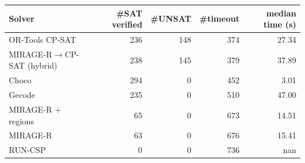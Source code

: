 \begin{table}[t]
{\begin{tabular}{lrrrr}
\toprule
Solver & \#SAT verified & \#UNSAT & \#timeout & median time (s) \\
\midrule
OR-Tools CP-SAT & 236 & 148 & 374 & 27.34 \\
MIRAGE-R$\to$CP-SAT (hybrid) & 238 & 145 & 379 & 37.89 \\
Choco & 294 & 0 & 452 & 3.01 \\
Gecode & 235 & 0 & 510 & 47.00 \\
MIRAGE-R + regions & 65 & 0 & 673 & 14.51 \\
MIRAGE-R & 63 & 0 & 676 & 15.41 \\
RUN-CSP & 0 & 0 & 736 & nan \\
\bottomrule
\end{tabular}}
{}
\end{table}
